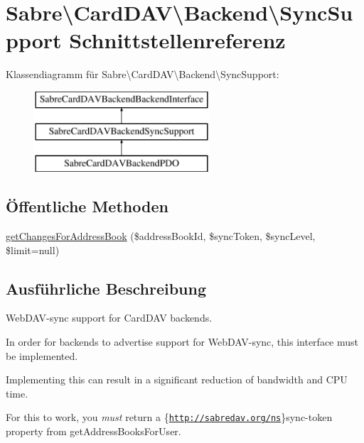 \hypertarget{interface_sabre_1_1_card_d_a_v_1_1_backend_1_1_sync_support}{}\section{Sabre\textbackslash{}Card\+D\+AV\textbackslash{}Backend\textbackslash{}Sync\+Support Schnittstellenreferenz}
\label{interface_sabre_1_1_card_d_a_v_1_1_backend_1_1_sync_support}
Klassendiagramm für Sabre\textbackslash{}Card\+D\+AV\textbackslash{}Backend\textbackslash{}Sync\+Support\+:\begin{figure}[H]
\begin{center}
\leavevmode
\includegraphics[height=3.000000cm]{interface_sabre_1_1_card_d_a_v_1_1_backend_1_1_sync_support}
\end{center}
\end{figure}
\subsection*{Öffentliche Methoden}
\begin{DoxyCompactItemize}
\item 
\mbox{\hyperlink{interface_sabre_1_1_card_d_a_v_1_1_backend_1_1_sync_support_a22986a624e847ee914606574686f7dcd}{get\+Changes\+For\+Address\+Book}} (\$address\+Book\+Id, \$sync\+Token, \$sync\+Level, \$limit=null)
\end{DoxyCompactItemize}


\subsection{Ausführliche Beschreibung}
Web\+D\+A\+V-\/sync support for Card\+D\+AV backends.

In order for backends to advertise support for Web\+D\+A\+V-\/sync, this interface must be implemented.

Implementing this can result in a significant reduction of bandwidth and C\+PU time.

For this to work, you {\itshape must} return a \{\href{http://sabredav.org/ns}{\tt http\+://sabredav.\+org/ns}\}sync-\/token property from get\+Address\+Books\+For\+User.

